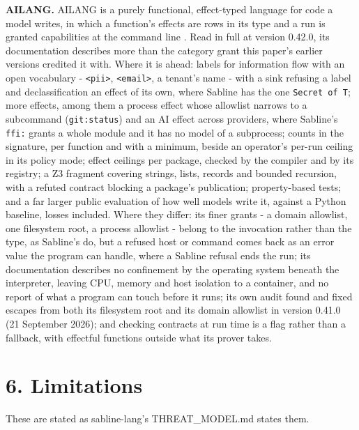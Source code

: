 \documentclass[
]{article}
\begin{document}
\textbf{AILANG.} AILANG is a purely functional, effect-typed language
for code a model writes, in which a function's effects are rows in its
type and a run is granted capabilities at the command line
\citep{ailang}. Read in full at version 0.42.0, its documentation
describes more than the category grant this paper's earlier versions
credited it with. Where it is ahead: labels for information flow with an
open vocabulary - \texttt{\textless{}pii\textgreater{}},
\texttt{\textless{}email\textgreater{}}, a tenant's name - with a sink
refusing a label and declassification an effect of its own, where
Sabline has the one \texttt{Secret\ of\ T}; more effects, among them a
process effect whose allowlist narrows to a subcommand
(\texttt{git:status}) and an AI effect across providers, where Sabline's
\texttt{ffi:} grants a whole module and it has no model of a subprocess;
counts in the signature, per function and with a minimum, beside an
operator's per-run ceiling in its policy mode; effect ceilings per
package, checked by the compiler and by its registry; a Z3 fragment
covering strings, lists, records and bounded recursion, with a refuted
contract blocking a package's publication; property-based tests; and a
far larger public evaluation of how well models write it, against a
Python baseline, losses included. Where they differ: its finer grants -
a domain allowlist, one filesystem root, a process allowlist - belong to
the invocation rather than the type, as Sabline's do, but a refused host
or command comes back as an error value the program can handle, where a
Sabline refusal ends the run; its documentation describes no confinement
by the operating system beneath the interpreter, leaving CPU, memory and
host isolation to a container, and no report of what a program can touch
before it runs; its own audit found and fixed escapes from both its
filesystem root and its domain allowlist in version 0.41.0 (21 September
2026); and checking contracts at run time is a flag rather than a
fallback, with effectful functions outside what its prover takes.

\section{6. Limitations}\label{limitations}

These are stated as sabline-lang's THREAT\_MODEL.md states them.
\end{document}
